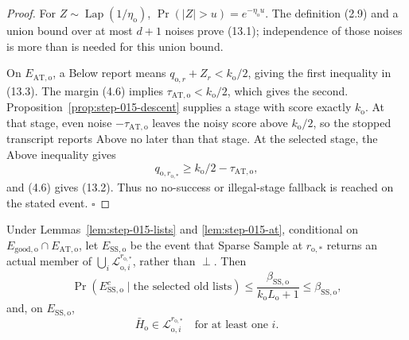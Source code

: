 \begin{proof}
For \(Z\sim\operatorname{Lap}(1/\eta_{\mathrm o})\),
\(\Pr(|Z|>u)=e^{-\eta_{\mathrm o}u}\). The definition (2.9) and a union
bound over at most \(d+1\) noises prove (13.1); independence of those
noises is more than is needed for this union bound.

On \(E_{\mathrm{AT,o}}\), a Below report means
\(q_{\mathrm o,r}+Z_r<k_{\mathrm o}/2\), giving the first inequality in
(13.3). The margin (4.6) implies
\(\tau_{\mathrm{AT,o}}<k_{\mathrm o}/2\), which gives the second.
Proposition~\ref{prop:step-015-descent} supplies a stage with score exactly
\(k_{\mathrm o}\). At that stage, even noise
\(-\tau_{\mathrm{AT,o}}\) leaves the noisy score above
\(k_{\mathrm o}/2\), so the stopped transcript reports Above no later than
that stage. At the selected stage, the Above inequality gives
\[
q_{\mathrm o,r_{\mathrm o,*}}
\ge k_{\mathrm o}/2-\tau_{\mathrm{AT,o}},
\]
and (4.6) gives (13.2). Thus no no-success or illegal-stage fallback is
reached on the stated event. \(\square\)


\end{proof}

\begin{proposition}\label{prop:step-015-sparse}
Under Lemmas~\ref{lem:step-015-lists} and
\ref{lem:step-015-at}, conditional on
\(E_{\mathrm{good,o}}\cap E_{\mathrm{AT,o}}\), let
\(E_{\mathrm{SS,o}}\) be the event that Sparse Sample at
\(r_{\mathrm o,*}\) returns an actual member of
\(\bigcup_i\mathcal L_{\mathrm o,i}^{r_{\mathrm o,*}}\), rather than
\(\perp\). Then
\[
\Pr(E_{\mathrm{SS,o}}^c
\mid\text{the selected old lists})
\le
\frac{\beta_{\mathrm{SS,o}}}{k_{\mathrm o}L_{\mathrm o}+1}
\le\beta_{\mathrm{SS,o}},
\tag{14.1}
\]
and, on \(E_{\mathrm{SS,o}}\),
\[
\bar H_{\mathrm o}\in
\mathcal L_{\mathrm o,i}^{r_{\mathrm o,*}}
\quad\text{for at least one }i.
\tag{14.2}
\]


\end{proposition}

